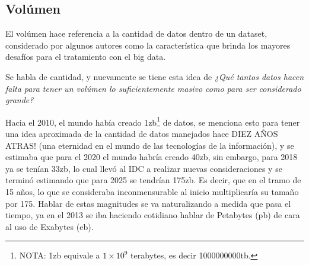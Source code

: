 \subsection{Volúmen}
\label{ssec:volumen}

El volúmen hace referencia a la cantidad de datos dentro de un \gls{dataset}\cites{ghasemaghaei2019,
ghasemaghaei2021}, considerado por algunos autores como la característica que
brinda los mayores desafíos para el tratamiento con el big data\cite{che2013}.

Se habla de cantidad, y nuevamente se tiene esta idea de \textit{¿Qué tantos datos hacen
falta para tener un volúmen lo suficientemente masivo como para ser considerado
grande?}

Hacia el 2010, el mundo había creado 1\acrshort{zb}\footnote{NOTA: 1\acrshort{zb} equivale a $1 \times
10^{9}$ terabytes, es decir 1000000000\acrshort{tb}.} de datos, se menciona
esto para tener
una idea aproximada de la cantidad de datos manejados hace DIEZ AÑOS ATRAS! (una
eternidad en el mundo de las tecnologías de la
información),  y se estimaba que para el 2020 el mundo habría creado 40\acrshort{zb}\cite{lam2017}, 
sin embargo, para 2018 ya se tenían 33\acrshort{zb}, lo cual llevó al IDC a 
realizar nuevas consideraciones y se terminó estimando
que para 2025 se tendrían 175\acrshort{zb}\cite{forbes2020}. Es decir,
que en el tramo de 15 años, lo que se consideraba inconmensurable al inicio
multiplicaría su tamaño por 175. Hablar de estas magnitudes se
va naturalizando a medida que pasa el tiempo, ya en el 2013 se iba haciendo
cotidiano hablar de Petabytes (\acrshort{pb}) de cara al uso de
Exabytes (\acrshort{eb})\cite{che2013}. 

